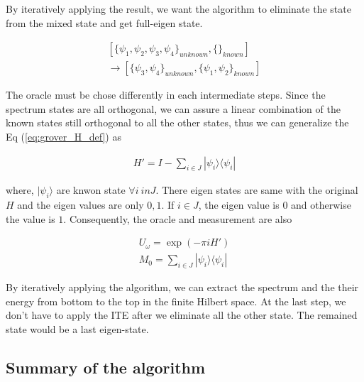 \documentclass[twocolumn]{article}
\begin{document}
By iteratively applying the result, we want the algorithm to 
eliminate the state from the mixed state and get full-eigen state.

\begin{equation}
    \begin{array}{l}
        [ \{\psi_1, \psi_2 , \psi_3, \psi_4\}_{unknown},  \{\}_{known}]\\
        \rightarrow [ \{\psi_3, \psi_4\}_{unknown}, \{\psi_1, \psi_2 \}_{known}]
    \end{array}
\end{equation}

The oracle must be chose differently in each intermediate steps.
Since the spectrum states are all orthogonal, we can assure a linear combination of 
the known states still orthogonal to all the other states, thus we can generalize the Eq (\ref{eq:grover_H_def})
as 

\begin{align}
    H' = I - \sum_{i \in J} | \psi_i \rangle \langle \psi_i |
\end{align}

where, $|\psi_i \rangle$ are knwon state $\forall i \ in J$.
There eigen states are same with the original $H$ and the eigen values are only $0, 1$.
If $i \in J$, the eigen value is $0$ and otherwise the value is $1$.
Consequently, the oracle and measurement are also 

\begin{align}
    U_\omega = \exp(-\pi i H')\label{eq:gen_oracle}\\
    M_0 = \sum_{i \in J} | \psi_i \rangle \langle \psi_i | \label{eq:gen_measure}
\end{align}

By iteratively applying the algorithm, we can extract the spectrum and the 
their energy from bottom to the top in the finite Hilbert space.
At the last step, we don't have to apply the ITE after we eliminate all the other state.
The remained state would be a last eigen-state.

\subsection{Summary of the algorithm}
\end{document}
